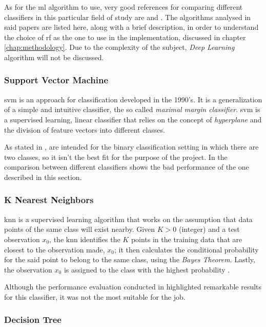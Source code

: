 As for the \gls{ml} algorithm to use, very good references for comparing different classifiers in this particular field of study are \cite{icissp17} and \cite{Mozley2020}. The algorithms analysed in said papers are listed here, along with a brief description, in order to understand the choice of \gls{rf} as the one to use in the implementation, discussed in chapter \ref{chap:methodology}. Due to the complexity of the subject, \textit{Deep Learning} algorithm will not be discussed.

\subsubsection{Support Vector Machine}
\label{subsubsec:svm}

\gls{svm} is an approach for classification developed in the 1990's. It is a generalization of a simple and intuitive classifier, the so called \textit{maximal margin classifier}. \gls{svm} is a supervised learning, linear classifier that relies on the concept of \textit{hyperplane} and the division of feature vectors into different classes.
\par As stated in \cite[p. 341]{James2014},  are intended for the binary classification setting in which there are two classes, so it isn't the best fit for the purpose of the project. In \cite{Mozley2020} the comparison between different classifiers shows the bad performance of the one described in this section.

\subsubsection{K Nearest Neighbors}
\label{subsubsec:knn}

\gls{knn} is a supervised learning algorithm that works on the assumption that data points of the same class will exist nearby. Given $K>0$ (integer) and a test observation $x_0$, the \gls{knn} identifies the $K$ points in the training data that are closest to the observation made, $x_0$; it then calculates the conditional probability for the said point to belong to the same class, using the \textit{Bayes Theorem}. Lastly, the observation $x_0$ is assigned to the class with the highest probability \cite[p. 39]{James2014}.
\par Although the performance evaluation conducted in \cite{Mozley2020} highlighted remarkable results for this classifier, it was not the most suitable for the job.

\subsubsection{Decision Tree}
\label{subsubsec:dt}

